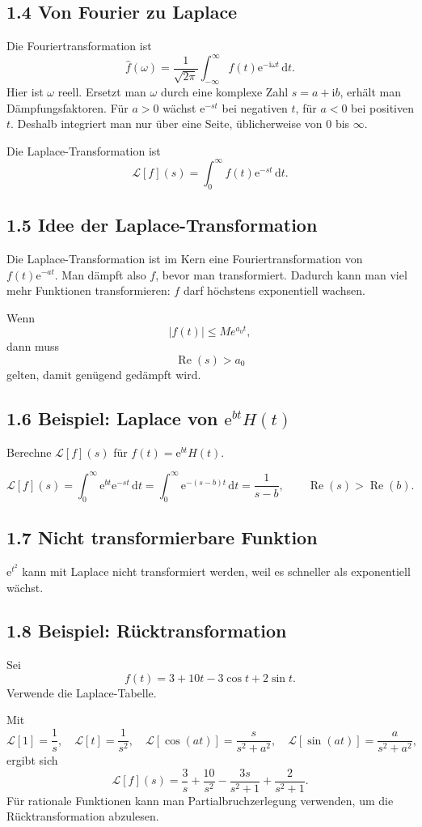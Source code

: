 \documentclass[11pt,a4paper]{article}
\newcommand{\ii}{\mathrm i}
\newcommand{\ee}{\mathrm e}
\newcommand{\dd}{\,\mathrm d}
\newcommand{\Ree}{\operatorname{Re}}
\begin{document}
\subsection{1.4 Von Fourier zu Laplace}
Die Fouriertransformation ist
\[
\widehat f(\omega)=\frac1{\sqrt{2\pi}}\int_{-\infty}^{\infty}f(t)\ee^{-\ii\omega t}\dd t.
\]
Hier ist $\omega$ reell. Ersetzt man $\omega$ durch eine komplexe Zahl $s=a+\ii b$, erhält man Dämpfungsfaktoren. Für $a>0$ wächst $\ee^{-st}$ bei negativen $t$, für $a<0$ bei positiven $t$. Deshalb integriert man nur über eine Seite, üblicherweise von $0$ bis $\infty$.

\begin{importantbox}
Die Laplace-Transformation ist
\[
\mathcal L[f](s)=\int_0^{\infty}f(t)\ee^{-st}\dd t.
\]
\end{importantbox}

\subsection{1.5 Idee der Laplace-Transformation}
Die Laplace-Transformation ist im Kern eine Fouriertransformation von $f(t)\ee^{-at}$. Man dämpft also $f$, bevor man transformiert. Dadurch kann man viel mehr Funktionen transformieren: $f$ darf höchstens exponentiell wachsen.

Wenn
\[
|f(t)|\le Me^{a_0t},
\]
dann muss
\[
\Ree(s)>a_0
\]
gelten, damit genügend gedämpft wird.

\subsection{1.6 Beispiel: Laplace von $\ee^{bt}H(t)$}
\begin{beispielbox}
Berechne $\mathcal L[f](s)$ für $f(t)=\ee^{bt}H(t)$.
\end{beispielbox}
\[
\mathcal L[f](s)=\int_0^{\infty}\ee^{bt}\ee^{-st}\dd t
=\int_0^{\infty}\ee^{-(s-b)t}\dd t
=\frac1{s-b},
\qquad \Ree(s)>\Ree(b).
\]

\subsection{1.7 Nicht transformierbare Funktion}
$\ee^{t^2}$ kann mit Laplace nicht transformiert werden, weil es schneller als exponentiell wächst.

\subsection{1.8 Beispiel: Rücktransformation}
\begin{beispielbox}
Sei
\[
f(t)=3+10t-3\cos t+2\sin t.
\]
Verwende die Laplace-Tabelle.
\end{beispielbox}
Mit
\[
\mathcal L[1]=\frac1s,
\quad
\mathcal L[t]=\frac1{s^2},
\quad
\mathcal L[\cos(at)]=\frac{s}{s^2+a^2},
\quad
\mathcal L[\sin(at)]=\frac{a}{s^2+a^2},
\]
ergibt sich
\[
\mathcal L[f](s)=\frac3s+\frac{10}{s^2}-\frac{3s}{s^2+1}+\frac{2}{s^2+1}.
\]
Für rationale Funktionen kann man Partialbruchzerlegung verwenden, um die Rücktransformation abzulesen.
\end{document}
